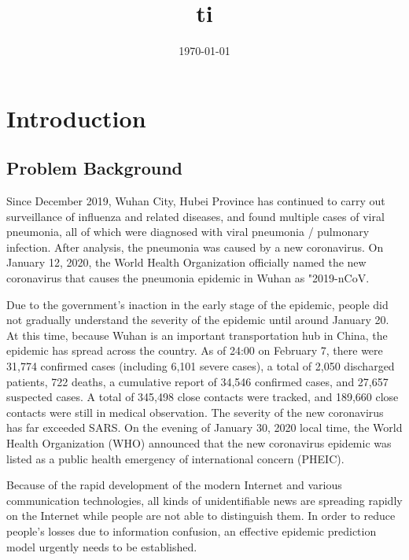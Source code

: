 \documentclass{mcmthesis}
\begin{document}
\linespread{0.6} %
\setlength{\parskip}{0.5\baselineskip} %
\title{ti}

\date{\today}
	\begin{abstract}

	
		\begin{keywords}
		
		\end{keywords}
	\end{abstract}

\maketitle

\tableofcontents

\newpage

\section{Introduction}
\subsection{Problem Background}
	Since December 2019, Wuhan City, Hubei Province has continued to carry out surveillance of influenza and related diseases, and found multiple cases of viral pneumonia, all of which were diagnosed with viral pneumonia / pulmonary infection.  After analysis, the pneumonia was caused by a new coronavirus.  On January 12, 2020, the World Health Organization officially named the new coronavirus that causes the pneumonia epidemic in Wuhan as "2019-nCoV.

Due to the government's inaction in the early stage of the epidemic, people did not gradually understand the severity of the epidemic until around January 20.  At this time, because Wuhan is an important transportation hub in China, the epidemic has spread across the country.  As of 24:00 on February 7, there were 31,774 confirmed cases (including 6,101 severe cases), a total of 2,050 discharged patients, 722 deaths, a cumulative report of 34,546 confirmed cases, and 27,657 suspected cases.  A total of 345,498 close contacts were tracked, and 189,660 close contacts were still in medical observation.  The severity of the new coronavirus has far exceeded SARS.  On the evening of January 30, 2020 local time, the World Health Organization (WHO) announced that the new coronavirus epidemic was listed as a public health emergency of international concern (PHEIC).

Because of the rapid development of the modern Internet and various communication technologies, all kinds of unidentifiable news are spreading rapidly on the Internet while people are not able to distinguish them.  In order to reduce people's losses due to information confusion, an effective epidemic prediction model urgently needs to be established.
\end{document}
